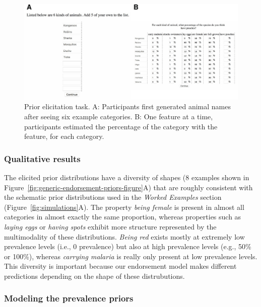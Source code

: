 \documentclass[english,,man,floatsintext]{apa6}
\theoremstyle{definition}
\theoremstyle{definition}
\theoremstyle{definition}
\theoremstyle{remark}
\begin{document}
\begin{figure}
\centering
\includegraphics{figs/generics-prior-task-1.pdf}
\caption{\label{fig:generics-prior-task}Prior elicitation task. A:
Participants first generated animal names after seeing six example
categories. B: One feature at a time, participants estimated the
percentage of the category with the feature, for each category.}
\end{figure}

\hypertarget{qualitative-results}{%
\subsubsection{Qualitative results}\label{qualitative-results}}

The elicited prior distributions have a diversity of shapes (8 examples
shown in Figure~\ref{fig:generic-endorsement-priors-figure}A) that are
roughly consistent with the schematic prior distributions used in the
\emph{Worked Examples} section (Figure~\ref{fig:simulations}A). The
property \emph{being female} is present in almost all categories in
almost exactly the same proportion, whereas properties such as
\emph{laying eggs} or \emph{having spots} exhibit more structure
represented by the multimodality of these distributions. \emph{Being
red} exists mostly at extremely low prevalence levels (i.e., 0
prevalence) but also at high prevalence levels (e.g., 50\% or 100\%),
whereas \emph{carrying malaria} is really only present at low prevalence
levels. This diversity is important because our endorsement model makes
different predictions depending on the shape of these distrubutions.

\hypertarget{modeling-the-prevalence-priors}{%
\subsubsection{Modeling the prevalence
priors}\label{modeling-the-prevalence-priors}}
\end{document}
